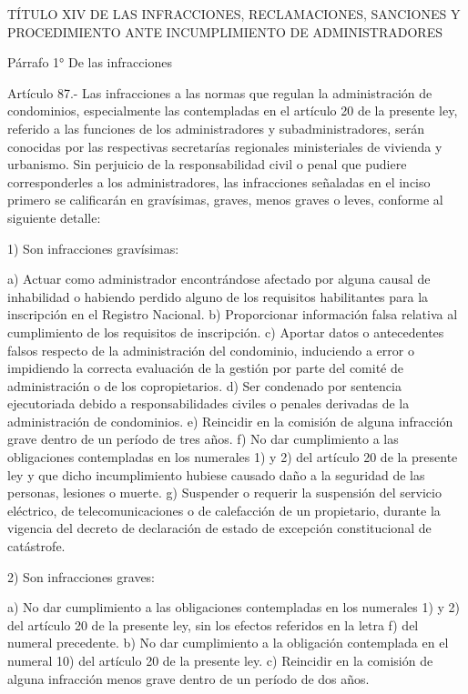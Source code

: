     TÍTULO XIV
    DE LAS INFRACCIONES, RECLAMACIONES, SANCIONES Y PROCEDIMIENTO ANTE INCUMPLIMIENTO DE ADMINISTRADORES

     
    Párrafo 1°
    De las infracciones

     
    Artículo 87.- Las infracciones a las normas que regulan la administración de condominios, especialmente las contempladas en el artículo 20 de la presente ley, referido a las funciones de los administradores y subadministradores, serán conocidas por las respectivas secretarías regionales ministeriales de vivienda y urbanismo.
    Sin perjuicio de la responsabilidad civil o penal que pudiere corresponderles a los administradores, las infracciones señaladas en el inciso primero se calificarán en gravísimas, graves, menos graves o leves, conforme al siguiente detalle:
     
    1) Son infracciones gravísimas:
     
    a) Actuar como administrador encontrándose afectado por alguna causal de inhabilidad o habiendo perdido alguno de los requisitos habilitantes para la inscripción en el Registro Nacional.
    b) Proporcionar información falsa relativa al cumplimiento de los requisitos de inscripción.
    c) Aportar datos o antecedentes falsos respecto de la administración del condominio, induciendo a error o impidiendo la correcta evaluación de la gestión por parte del comité de administración o de los copropietarios.
    d) Ser condenado por sentencia ejecutoriada debido a responsabilidades civiles o penales derivadas de la administración de condominios.
    e) Reincidir en la comisión de alguna infracción grave dentro de un período de tres años.
    f) No dar cumplimiento a las obligaciones contempladas en los numerales 1) y 2) del artículo 20 de la presente ley y que dicho incumplimiento hubiese causado daño a la seguridad de las personas, lesiones o muerte.
    g) Suspender o requerir la suspensión del servicio eléctrico, de telecomunicaciones o de calefacción de un propietario, durante la vigencia del decreto de declaración de estado de excepción constitucional de catástrofe.
     
    2) Son infracciones graves:
     
    a) No dar cumplimiento a las obligaciones contempladas en los numerales 1) y 2) del artículo 20 de la presente ley, sin los efectos referidos en la letra f) del numeral precedente.
    b) No dar cumplimiento a la obligación contemplada en el numeral 10) del artículo 20 de la presente ley.
    c) Reincidir en la comisión de alguna infracción menos grave dentro de un período de dos años.
     
